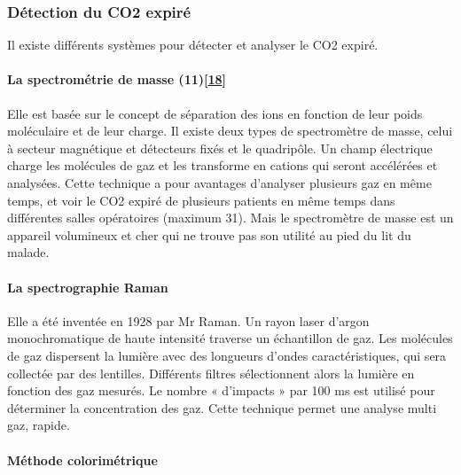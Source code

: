 \documentclass[12pt,]{article}
\let\oldparagraph\paragraph
\renewcommand{\paragraph}[1]{\oldparagraph{#1}\mbox{}}
\begin{document}
\hypertarget{detection-du-co2-expire}{%
\subsubsection{Détection du CO2 expiré}\label{detection-du-co2-expire}}

Il existe différents systèmes pour détecter et analyser le CO2 expiré.

\hypertarget{la-spectrometrie-de-masse-11bhavani1992capnometry}{%
\paragraph{\texorpdfstring{La spectrométrie de masse
(11){[}\protect\hyperlink{ref-bhavani1992capnometry}{18}{]}}{La spectrométrie de masse (11){[}18{]}}}\label{la-spectrometrie-de-masse-11bhavani1992capnometry}}

Elle est basée sur le concept de séparation des ions en fonction de leur
poids moléculaire et de leur charge. Il existe deux types de
spectromètre de masse, celui à secteur magnétique et détecteurs fixés et
le quadripôle. Un champ électrique charge les molécules de gaz et les
transforme en cations qui seront accélérées et analysées. Cette
technique a pour avantages d'analyser plusieurs gaz en même temps, et
voir le CO2 expiré de plusieurs patients en même temps dans différentes
salles opératoires (maximum 31). Mais le spectromètre de masse est un
appareil volumineux et cher qui ne trouve pas son utilité au pied du lit
du malade.

\hypertarget{la-spectrographie-raman}{%
\paragraph{La spectrographie Raman}\label{la-spectrographie-raman}}

Elle a été inventée en 1928 par Mr Raman. Un rayon laser d'argon
monochromatique de haute intensité traverse un échantillon de gaz. Les
molécules de gaz dispersent la lumière avec des longueurs d'ondes
caractéristiques, qui sera collectée par des lentilles. Différents
filtres sélectionnent alors la lumière en fonction des gaz mesurés. Le
nombre « d'impacts » par 100 ms est utilisé pour déterminer la
concentration des gaz. Cette technique permet une analyse multi gaz,
rapide.

\hypertarget{methode-colorimetrique}{%
\paragraph{Méthode colorimétrique}\label{methode-colorimetrique}}
\end{document}
